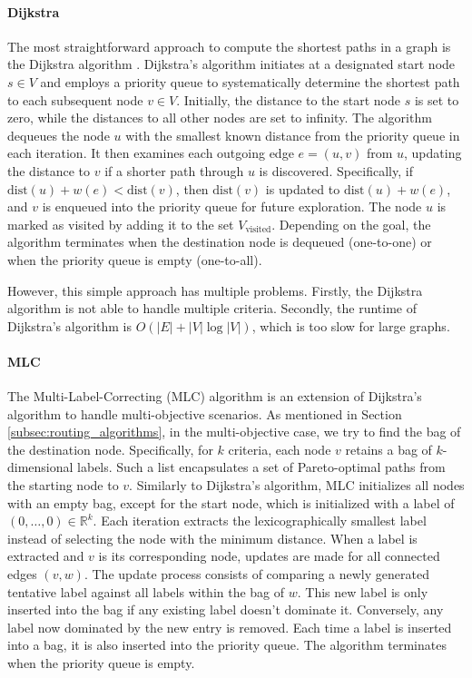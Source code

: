 \paragraph{Dijkstra}
\label{subsubsec:dijkstra}
The most straightforward approach to compute the shortest paths in a graph is the Dijkstra algorithm .
Dijkstra's algorithm initiates at a designated start node \( s \in V \) and employs a priority queue to systematically determine the shortest path to each subsequent node \( v \in V \).
Initially, the distance to the start node \( s \) is set to zero, while the distances to all other nodes are set to infinity.
The algorithm dequeues the node \( u \) with the smallest known distance from the priority queue in each iteration.
It then examines each outgoing edge \( e = (u, v) \) from \( u \), updating the distance to \( v \) if a shorter path through \( u \) is discovered.
Specifically, if \( \text{dist}(u) + w(e) < \text{dist}(v) \), then \( \text{dist}(v) \) is updated to \( \text{dist}(u) + w(e) \), and \( v \) is enqueued into the priority queue for future exploration.
The node \( u \) is marked as visited by adding it to the set \( V_{\text{visited}} \).
Depending on the goal, the algorithm terminates when the destination node is dequeued (one-to-one) or when the priority queue is empty (one-to-all).


However, this simple approach has multiple problems.
Firstly, the Dijkstra algorithm is not able to handle multiple criteria.
Secondly, the runtime of Dijkstra's algorithm is \( O(|E| + |V| \log |V|) \), which is too slow for large graphs.

\paragraph{MLC}
\label{subsubsec:mlc}

The Multi-Label-Correcting (MLC)  algorithm is an extension of Dijkstra's algorithm to handle multi-objective scenarios.
As mentioned in Section \ref{subsec:routing_algorithms}, in the multi-objective case, we try to find the bag of the destination node.
Specifically, for \(k\) criteria, each node \(v\) retains a bag of \(k\)-dimensional labels. Such a list encapsulates a set of Pareto-optimal paths from the starting node to \(v\).
Similarly to Dijkstra's algorithm, MLC initializes all nodes with an empty bag, except for the start node, which is initialized with a label of \( (0, \dots, 0) \in \mathbb{R}^k \).
Each iteration extracts the lexicographically smallest label instead of selecting the node with the minimum distance.
When a label is extracted and \(v\) is its corresponding node, updates are made for all connected edges \( (v, w) \).
The update process consists of comparing a newly generated tentative label against all labels within the bag of \(w\).
This new label is only inserted into the bag if any existing label doesn't dominate it.
Conversely, any label now dominated by the new entry is removed.
Each time a label is inserted into a bag, it is also inserted into the priority queue.
The algorithm terminates when the priority queue is empty.


